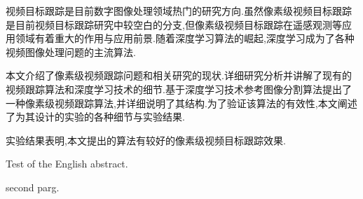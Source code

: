 \begin{cabstract}
	视频目标跟踪是目前数字图像处理领域热门的研究方向.虽然像素级视频目标跟踪是目前视频目标跟踪研究中较空白的分支,但像素级视频目标跟踪在遥感观测等应用领域有着重大的作用与应用前景.随着深度学习算法的崛起,深度学习成为了各种视频图像处理问题的主流算法.
	\par
	本文介绍了像素级视频跟踪问题和相关研究的现状.详细研究分析并讲解了现有的视频跟踪算法和深度学习技术的细节.基于深度学习技术参考图像分割算法提出了一种像素级视频跟踪算法,并详细说明了其结构.为了验证该算法的有效性,本文阐述了为其设计的实验的各种细节与实验结果.
	\par
	实验结果表明,本文提出的算法有较好的像素级视频目标跟踪效果.
\end{cabstract}

\begin{eabstract}
	Test of the English abstract.
	\par
	second parg.
\end{eabstract}

